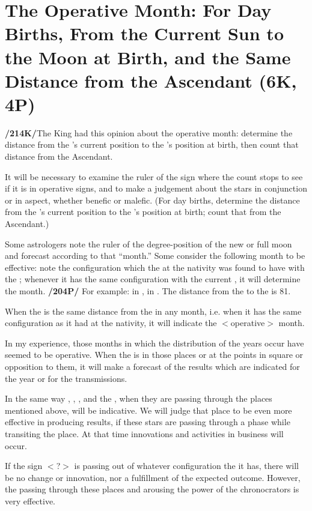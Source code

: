 \section{The Operative Month: For Day Births, From the Current Sun to the Moon at Birth, and the Same Distance from the Ascendant (6K, 4P)}

\textbf{/214K/}The King had this opinion about the operative month: determine the distance from the \Sun’s current position to the \Moon’s position at birth, then count that distance from the Ascendant. 

It will be necessary to examine the ruler of the sign where the count stops to see if it is in operative signs, and to make a judgement about the stars in conjunction or in aspect, whether benefic or malefic. (For day births, determine the distance from the \Moon’s current position to the \Sun’s position at birth; count that from the Ascendant.)

Some astrologers note the ruler of the degree-position of the new or full moon and forecast according to that “month.” Some consider the following month to be effective: note the configuration which the \Moon\xspace at the nativity was found to have with the \Sun; whenever it has the same configuration with the current \Sun,
it will determine the month. \textbf{/204P/} For example: \Sun\xspace in \Leo\xspace 5\deg, \Moon\xspace in \Libra\xspace 2\deg. The distance from
the \Sun\xspace to the \Moon\xspace is 81\deg. 

When the \Moon\xspace is the same distance from the \Sun\xspace in any month, i.e. when it has the same configuration as it had at the nativity, it will indicate the $<$operative$>$ month.

In my experience, those months in which the distribution of the years occur have seemed to be operative. When the \Sun\xspace is in those places or at the points in square or opposition to them, it will make a
forecast of the results which are indicated for the year or for the transmissions. 

In the same way \Mars, \Venus, \Mercury, and the \Moon, when they are passing through the places mentioned above, will be indicative. We will judge that place to be even more effective in producing results, if these stars are passing through a phase while transiting the place. At that time innovations and activities in business will occur. 

If the sign $<$?$>$ is passing out of whatever configuration the it has, there will be no change or innovation, nor a fulfillment of the expected outcome. However, the \Sun\xspace passing through these places and
arousing the power of the chronocrators is very effective.



\newpage